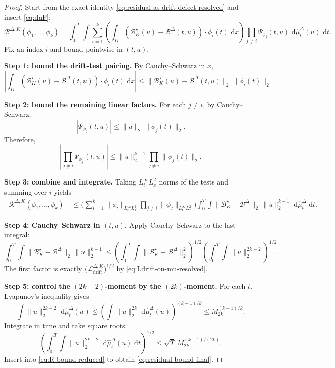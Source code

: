 \documentclass{article}
\numberwithin{equation}{section}
\theoremstyle{plain}
\theoremstyle{definition}
\theoremstyle{remark}
\newcommand{\dd}{\,\mathrm{d}}
\begin{document}
\begin{proof}
Start from the exact identity \eqref{eq:residual-as-drift-defect-resolved} and insert \eqref{eq:duF}:
\[
\mathcal R^{\Delta,K}(\phi_1,\dots,\phi_k)
=
\int_0^T\int
\sum_{i=1}^k
\left(\int_D (\mathcal B^\star_K(u)-\mathcal B^\Delta(t,u))\cdot\phi_i(t)\,\dd x\right)
\prod_{j\ne i}\Psi_{\phi_j}(t,u)\,
\dd\widehat\mu^\Delta_t(u)\,\dd t.
\]
Fix an index $i$ and bound pointwise in $(t,u)$.

\smallskip
\noindent\textbf{Step 1: bound the drift-test pairing.}
By Cauchy--Schwarz in $x$,
\begin{equation}\label{eq:drift-pair-bound}
\left|\int_D (\mathcal B^\star_K(u)-\mathcal B^\Delta(t,u))\cdot\phi_i(t)\,\dd x\right|
\le \|\mathcal B^\star_K(u)-\mathcal B^\Delta(t,u)\|_2\,\|\phi_i(t)\|_2.
\end{equation}

\smallskip
\noindent\textbf{Step 2: bound the remaining linear factors.}
For each $j\ne i$, by Cauchy--Schwarz,
\begin{equation}\label{eq:Psi-bound}
|\Psi_{\phi_j}(t,u)|
\le \|u\|_2\,\|\phi_j(t)\|_2.
\end{equation}
Therefore,
\[
\left|\prod_{j\ne i}\Psi_{\phi_j}(t,u)\right|
\le \|u\|_2^{k-1}\prod_{j\ne i}\|\phi_j(t)\|_2.
\]

\smallskip
\noindent\textbf{Step 3: combine and integrate.}
Taking $L^\infty_tL^2_x$ norms of the tests and summing over $i$ yields
\begin{align}
|\mathcal R^{\Delta,K}(\phi_1,\dots,\phi_k)|
&\le
\Bigg(\sum_{i=1}^k \|\phi_i\|_{L^\infty_tL^2_x}\prod_{j\ne i}\|\phi_j\|_{L^\infty_tL^2_x}\Bigg)
\int_0^T\int \|\mathcal B^\star_K-\mathcal B^\Delta\|_2\,\|u\|_2^{k-1}\,\dd\widehat\mu^\Delta_t\,\dd t.
\label{eq:R-bound-reduced}
\end{align}

\smallskip
\noindent\textbf{Step 4: Cauchy--Schwarz in $(t,u)$.}
Apply Cauchy--Schwarz to the last integral:
\[
\int_0^T\int \|\mathcal B^\star_K-\mathcal B^\Delta\|_2\,\|u\|_2^{k-1}
\le
\left(\int_0^T\int \|\mathcal B^\star_K-\mathcal B^\Delta\|_2^2\right)^{1/2}
\left(\int_0^T\int \|u\|_2^{2k-2}\right)^{1/2}.
\]
The first factor is exactly $\big(\mathcal L_{\mathrm{drift}}^{\Delta,K}\big)^{1/2}$ by \eqref{eq:Ldrift-on-mu-resolved}.

\smallskip
\noindent\textbf{Step 5: control the $(2k-2)$-moment by the $(2k)$-moment.}
For each $t$, Lyapunov's inequality gives
\[
\int \|u\|_2^{2k-2}\,\dd\widehat\mu^\Delta_t(u)
\le
\left(\int \|u\|_2^{2k}\,\dd\widehat\mu^\Delta_t(u)\right)^{(k-1)/k}
\le M_{2k}^{(k-1)/k}.
\]
Integrate in time and take square roots:
\[
\left(\int_0^T\int \|u\|_2^{2k-2}\,\dd\widehat\mu^\Delta_t(u)\,\dd t\right)^{1/2}
\le \sqrt{T}\,M_{2k}^{(k-1)/(2k)}.
\]
Insert into \eqref{eq:R-bound-reduced} to obtain \eqref{eq:residual-bound-final}.
\end{proof}
\end{document}
